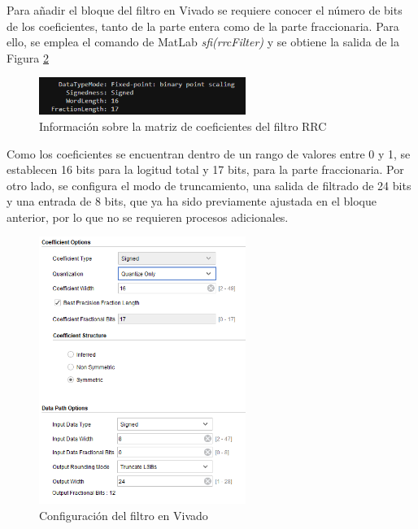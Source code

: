 Para añadir el bloque del filtro en Vivado se requiere conocer el número de bits de los coeficientes, tanto de la parte entera como de la parte fraccionaria. Para ello, se emplea el comando de MatLab \textit{sfi(rrcFilter)} y se obtiene la salida de la Figura \ref{fig:fvtool2}

\vspace{3mm}

\begin{figure}[h]
	\centering
	\includegraphics[width=0.6\textwidth]{img/matlab/coefs.PNG}
	\caption{Información sobre la matriz de coeficientes del filtro RRC}
	\label{fig:fvtool2}
\end{figure}
    
\vspace{3mm}

Como los coeficientes se encuentran dentro de un rango de valores entre 0 y 1, se establecen 16 bits para la logitud total y 17 bits, para la parte fraccionaria. Por otro lado, se configura el modo de truncamiento, una salida de filtrado de 24 bits y una entrada de 8 bits, que ya ha sido previamente ajustada en el bloque anterior, por lo que no se requieren procesos adicionales.

\vspace{3mm}

\begin{figure}[h]
	\centering
	\includegraphics[width=0.6\textwidth]{img/diseno/fir.PNG}
	\caption{Configuración del filtro en Vivado}
	\label{fig:fvtool2}
\end{figure}
    
